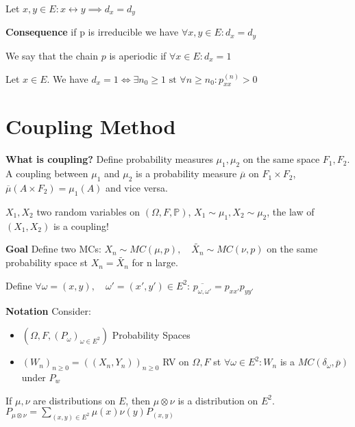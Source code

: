 \begin{prop}[]
	Let $x,y \in E: x \leftrightarrow y \implies d_x=d_y$
\end{prop}

\textbf{Consequence} if p is irreducible we have $\forall x,y \in E: d_x = d_y$ 

\begin{defn}
	We say that the chain $p$ is aperiodic if $\forall x \in E: d_x=1$
\end{defn}

\begin{prop}[]
	Let $x \in E$. We have $d_x=1 \iff \exists n_0 \geq 1 \textrm{ st } \forall n \geq n_0: p_{xx}^{(n)}>0$
\end{prop}

\section{Coupling Method}
\textbf{What is coupling?}
Define probability measures $\mu_1, \mu_2$ on the same space $F_1,F_2$. A coupling between $\mu_1$ and $\mu_2$ is a probability measure $\overline{\mu }$ on $F_1 \times F_2$, 
$\overline{\mu }(A \times F_2)=\mu_1(A)$ and vice versa. 

$X_1, X_2$ two random variables on $(\Omega, F, \mathbb{P}) $, $X_1 \sim \mu_1, X_2 \sim \mu_2$, the law of $(X_1,X_2)$ is a coupling!

\noindent
\textbf{Goal} Define two MCs: $X_n \sim MC(\mu, p), \quad \tilde{X_n} \sim MC(\nu, p) $ on the same probability space st $X_n = \tilde{X_n}$ for n large.

\begin{defn}
	Define $\forall \omega=(x,y), \quad \omega'=(x',y') \in E^2$: $\overline{p_{\omega, \omega'}}=p_{xx'}p_{yy'}$
\end{defn}

\noindent
\textbf{Notation} Consider:
\begin{itemize}
	\item $(\Omega, F, (P_\omega)_{\omega \in E^2})$ Probability Spaces
	\item $(W_n)_{n\geq 0}=((X_n,Y_n))_{n\geq 0}$ RV on $\Omega, F$ st $\forall \omega \in E^2: W_n$ is a $MC(\delta_\omega, \overline{p})$ under $P_w$
\end{itemize}

\begin{rmk}[]
	If $\mu, \nu $ are distributions on $E$, then $\mu \otimes \nu $ is a distribution on $E^2$. $P_{\mu \otimes \nu }= \sum_{(x,y)\in E^2}^{}\mu (x) \nu (y) P_{(x,y)} $
\end{rmk}

